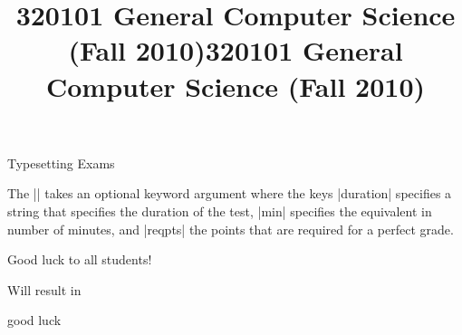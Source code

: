 \begin{sfragment}{Typesetting Exams}

The |\testheading| takes an optional keyword argument
where the keys |duration| specifies a string that specifies the
duration of the test, |min| specifies the equivalent in number of
minutes, and |reqpts| the points that are required for a perfect
grade.

\begin{latexcode}
\title{320101 General Computer Science (Fall 2010)}
\begin{testheading}[duration=one hour,min=60,reqpts=27]
  Good luck to all students!
\end{testheading}
\end{latexcode}

Will result in
\begin{center}
  \begin{minipage}{.9\textwidth}
\makeatletter
{}
\makeatother
\title{320101 General Computer Science (Fall 2010)}
\begin{testheading}[duration=one hour,min=60,reqpts=27]
  good luck
\end{testheading}
\end{minipage}
\end{center}
\end{sfragment}


